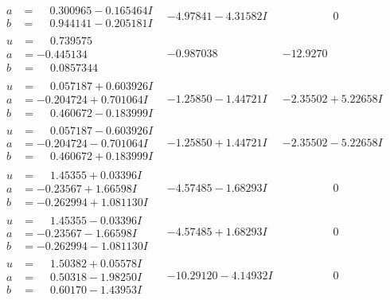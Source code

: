 \documentclass[1p]{elsarticle_modified}
\theoremstyle{definition}
\begin{document}
$$\begin{array}{c|c|c}
\begin{aligned}
a &= \phantom{-}0.300965 - 0.165464 I \\
b &= \phantom{-}0.944141 - 0.205181 I\end{aligned}
 & -4.97841 - 4.31582 I & \phantom{-0.000000 } 0 \\ \hline\begin{aligned}
u &= \phantom{-}0.739575\phantom{ +0.000000I} \\
a &= -0.445134\phantom{ +0.000000I} \\
b &= \phantom{-}0.0857344\phantom{ +0.000000I}\end{aligned}
 & -0.987038\phantom{ +0.000000I} & -12.9270\phantom{ +0.000000I} \\ \hline\begin{aligned}
u &= \phantom{-}0.057187 + 0.603926 I \\
a &= -0.204724 + 0.701064 I \\
b &= \phantom{-}0.460672 - 0.183999 I\end{aligned}
 & -1.25850 - 1.44721 I & -2.35502 + 5.22658 I \\ \hline\begin{aligned}
u &= \phantom{-}0.057187 - 0.603926 I \\
a &= -0.204724 - 0.701064 I \\
b &= \phantom{-}0.460672 + 0.183999 I\end{aligned}
 & -1.25850 + 1.44721 I & -2.35502 - 5.22658 I \\ \hline\begin{aligned}
u &= \phantom{-}1.45355 + 0.03396 I \\
a &= -0.23567 + 1.66598 I \\
b &= -0.262994 + 1.081130 I\end{aligned}
 & -4.57485 - 1.68293 I & \phantom{-0.000000 } 0 \\ \hline\begin{aligned}
u &= \phantom{-}1.45355 - 0.03396 I \\
a &= -0.23567 - 1.66598 I \\
b &= -0.262994 - 1.081130 I\end{aligned}
 & -4.57485 + 1.68293 I & \phantom{-0.000000 } 0 \\ \hline\begin{aligned}
u &= \phantom{-}1.50382 + 0.05578 I \\
a &= \phantom{-}0.50318 - 1.98250 I \\
b &= \phantom{-}0.60170 - 1.43953 I\end{aligned}
 & -10.29120 - 4.14932 I & \phantom{-0.000000 } 0 \\ \hline\begin{aligned}

\end{aligned}
\end{array}$$
\end{document}
